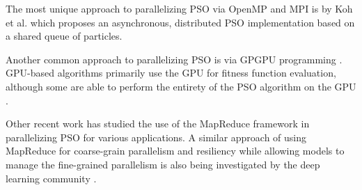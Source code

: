 The most unique approach to parallelizing PSO via OpenMP and MPI is by Koh et
al. \cite{papso} which proposes an asynchronous, distributed PSO implementation
based on a shared queue of particles. 

Another common approach to parallelizing PSO is via GPGPU programming
\cite{gpu-ppso, gpu-pso, biopsogpu}. GPU-based
algorithms primarily use the GPU for fitness function evaluation, although
some are able to perform the entirety of the PSO algorithm on the GPU
\cite{swarmgrid, multiswarmpso-gpu}.

Other recent work \cite{mrcpso, mprso, coop-pso, intrusion-pso} has
studied the use of the MapReduce framework \cite{mapreduce} in parallelizing PSO
for various applications.
A similar approach of using
MapReduce for coarse-grain parallelism and resiliency while allowing
models to manage the fine-grained
parallelism is also being investigated by the deep learning community \cite{mrpnn,
  heterospark, dlspark}. 


